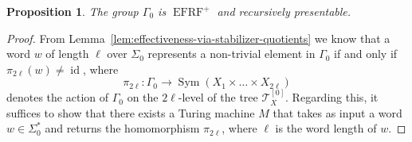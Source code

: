 \documentclass[a4paper]{amsart}
\numberwithin{equation}{section}
\newtheorem{proposition}[theorem]{Proposition}
\theoremstyle{definition}
\theoremstyle{remark}
\DeclareMathOperator{\EFRF}{EFRF}
\DeclareMathOperator{\id}{id}
\DeclareMathOperator{\Sym}{Sym}
\newcommand{\T}{\mathcal{T}}
\begin{document}
\begin{proposition}\label{prop:Gamma-eff-res-fin}
The group $\Gamma_0$ is $\EFRF^{+}$ and recursively presentable.
\end{proposition}
\begin{proof}
From Lemma~\ref{lem:effectiveness-via-stabilizer-quotients} we know that a word $w$ of length $\ell$ over $\Sigma_{0}$ represents a non-trivial element in $\Gamma_0$ if and only if $\pi_{2 \ell}(w) \neq \id$, where
\[
\pi_{2 \ell} \colon \Gamma_0 \rightarrow \Sym(X_1 \times \ldots \times X_{2\ell})
\]
denotes the action of $\Gamma_0$ on the $2\ell$-level of the tree $\T_X^{[0]}$.
Regarding this, it suffices to show that there exists a Turing machine $M$ that takes as input a word $w \in \Sigma_{0}^{\ast}$ and returns the homomorphism $\pi_{2 \ell}$, where $\ell$ is the word length of $w$.
									   

\end{proof}
\end{document}

